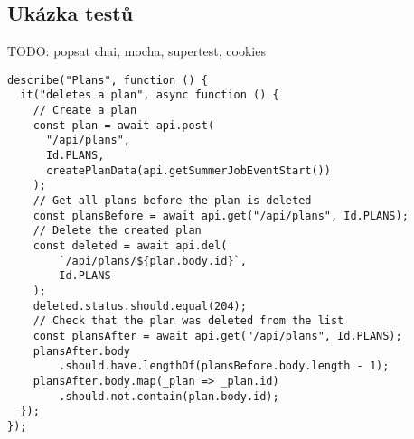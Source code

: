 \subsection{Ukázka testů}

TODO: popsat chai, mocha, supertest, cookies


\begin{verbatim}
describe("Plans", function () {
  it("deletes a plan", async function () {
    // Create a plan
    const plan = await api.post(
      "/api/plans",
      Id.PLANS,
      createPlanData(api.getSummerJobEventStart())
    );
    // Get all plans before the plan is deleted
    const plansBefore = await api.get("/api/plans", Id.PLANS);
    // Delete the created plan
    const deleted = await api.del(
        `/api/plans/${plan.body.id}`,
        Id.PLANS
    );
    deleted.status.should.equal(204);
    // Check that the plan was deleted from the list
    const plansAfter = await api.get("/api/plans", Id.PLANS);
    plansAfter.body
        .should.have.lengthOf(plansBefore.body.length - 1);
    plansAfter.body.map(_plan => _plan.id)
        .should.not.contain(plan.body.id);
  });
});
\end{verbatim}
